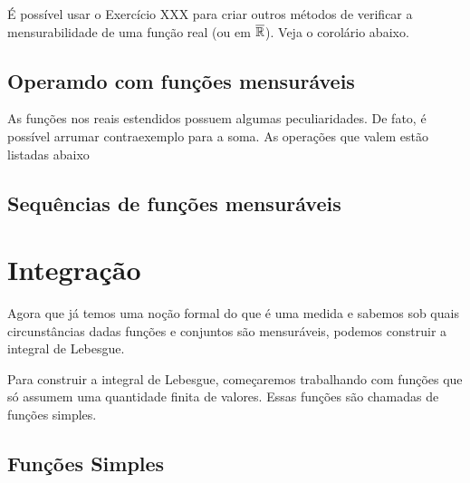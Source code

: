 É possível usar o Exercício XXX para criar outros métodos de verificar a mensurabilidade de uma função real (ou em $\overline{\mathbb{R}}$). Veja o corolário abaixo.

\measurableFunctionsInRExtend

\constantFunction
\characteristicFunction

\subsection{Operamdo com funções mensuráveis}
\measurableFunctionsOperations

As funções nos reais estendidos possuem algumas peculiaridades. De fato, é possível arrumar contraexemplo para a soma. As operações que valem estão listadas abaixo

\measurableFunctionsOperationsRExtend

\measurableFunctionsNotation

\subsection{Sequências de funções mensuráveis}

\measurableFunctionsSequences











\section{Integração}

Agora que já temos uma noção formal do que é uma medida e sabemos sob quais circunstâncias dadas funções e conjuntos são mensuráveis, podemos construir a integral de Lebesgue.

Para construir a integral de Lebesgue, começaremos trabalhando com funções que só assumem uma quantidade finita de valores. Essas funções são chamadas de funções simples.

\subsection{Funções Simples}

\simpleFunctions
\simpleFunctionsSemiStandardRepresentation
\simpleFunctionsStandardRepresentation

